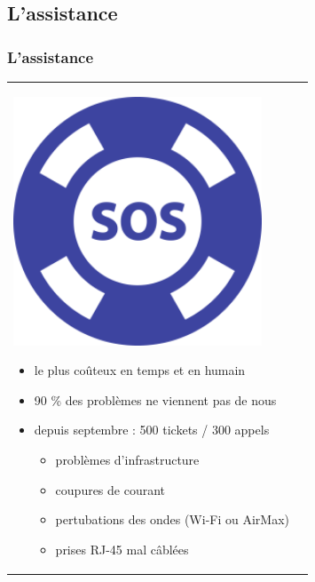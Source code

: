 \documentclass[handout]{beamer}
\begin{document}
	\subsection{L'assistance}
		\begin{frame}
		\frametitle{L'assistance}
		\begin{tabular}{l l}
			\begin{minipage}{0.2\textwidth}
				\begin{center}
					\includegraphics[width=0.9\textwidth]{images/support.png}
				\end{center}
			\end{minipage}

			\begin{minipage}{0.8\textwidth}
				\begin{itemize}
					\item le plus coûteux en temps et en humain
					\item 90 \% des problèmes ne viennent pas de nous
					\item depuis septembre : 500 tickets / 300 appels
					\begin{itemize}
						\item problèmes d'infrastructure
						\item coupures de courant
						\item pertubations des ondes (Wi-Fi ou AirMax)
						\item prises RJ-45 mal câblées
					\end{itemize}
				\end{itemize}
			\end{minipage}
			
		\end{tabular}
		\end{frame}
\end{document}
